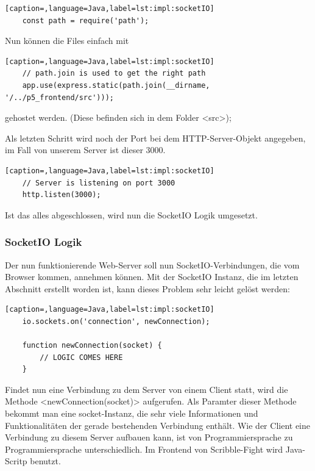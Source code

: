 \begin{lstlisting}[caption=,language=Java,label=lst:impl:socketIO]
    const path = require('path');
\end{lstlisting}

Nun können die Files einfach mit \\

\begin{lstlisting}[caption=,language=Java,label=lst:impl:socketIO]
    // path.join is used to get the right path 
    app.use(express.static(path.join(__dirname, '/../p5_frontend/src')));
\end{lstlisting}

gehostet werden. (Diese befinden sich in dem Folder <src>);

Als letzten Schritt wird noch der Port bei dem HTTP-Server-Objekt angegeben, im Fall von unserem Server ist dieser 3000. 
\begin{lstlisting}[caption=,language=Java,label=lst:impl:socketIO]
    // Server is listening on port 3000
    http.listen(3000);
\end{lstlisting}

Ist das alles abgeschlossen, wird nun die SocketIO Logik umgesetzt. 

\subsubsection{SocketIO Logik}
Der nun funktionierende Web-Server soll nun SocketIO-Verbindungen, die vom Browser kommen, annehmen können.
Mit der SocketIO Instanz, die im letzten Abschnitt erstellt worden ist, kann dieses Problem sehr leicht gelöst werden:

\begin{lstlisting}[caption=,language=Java,label=lst:impl:socketIO]
    io.sockets.on('connection', newConnection);

    function newConnection(socket) {
        // LOGIC COMES HERE
    }
\end{lstlisting}

Findet nun eine Verbindung zu dem Server von einem Client statt, wird die Methode <newConnection(socket)> aufgerufen. 
Als Paramter dieser Methode bekommt man eine socket-Instanz, die sehr viele Informationen und Funktionalitäten der gerade bestehenden Verbindung enthält.
Wie der Client eine Verbindung zu diesem Server aufbauen kann, ist von Programmiersprache zu Programmiersprache unterschiedlich. Im Frontend von Scribble-Fight wird Java-Scritp benutzt. 

